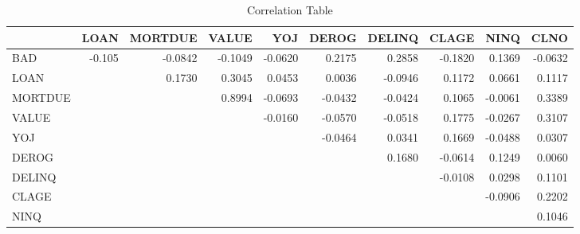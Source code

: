 \begin{appendices}
\begin{landscape}
\begin{table}[ht]
	\centering
	\renewcommand{\arraystretch}{2}
	\begin{tabular}{lrrrrrrrrr}
		\toprule
		{} &   LOAN &  MORTDUE &   VALUE &     YOJ &   DEROG &  DELINQ &   CLAGE &    NINQ &    CLNO \\
		\midrule
		BAD       & -0.105 &  -0.0842 & -0.1049 & -0.0620 &  0.2175 &  0.2858 & -0.1820 &  0.1369 & -0.0632 \\
		LOAN       &     &   0.1730 &  0.3045 &  0.0453 &  0.0036 & -0.0946 &  0.1172 &  0.0661 &  0.1117 \\
		MORTDUE   &     &       &  0.8994 & -0.0693 & -0.0432 & -0.0424 &  0.1065 & -0.0061 &  0.3389 \\
		VALUE      &     &       &      & -0.0160 & -0.0570 & -0.0518 &  0.1775 & -0.0267 &  0.3107 \\
		YOJ        &     &       &      &      & -0.0464 &  0.0341 &  0.1669 & -0.0488 &  0.0307 \\
		DEROG      &     &       &      &      &      &  0.1680 & -0.0614 &  0.1249 &  0.0060 \\
		DELINQ     &     &       &      &      &      &      & -0.0108 &  0.0298 &  0.1101 \\
		CLAGE      &     &       &      &      &      &      &      & -0.0906 &  0.2202 \\
		NINQ       &     &       &      &      &      &      &      &      &  0.1046 \\
		\bottomrule
	\end{tabular}
	\caption{Correlation Table \label{CORR_TBL}}
\end{table}
\end{landscape}


\end{appendices}
